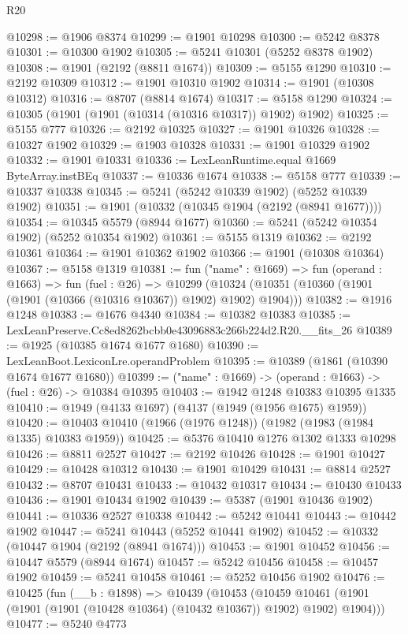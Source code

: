 \begin{lexlean}{R20}
\begin{coremodule}
@10298 := @1906 @8374
@10299 := @1901 @10298
@10300 := @5242 @8378
@10301 := @10300 @1902
@10305 := @5241 @10301 (@5252 @8378 @1902)
@10308 := @1901 (@2192 (@8811 @1674))
@10309 := @5155 @1290
@10310 := @2192 @10309
@10312 := @1901 @10310 @1902
@10314 := @1901 (@10308 @10312)
@10316 := @8707 (@8814 @1674)
@10317 := @5158 @1290
@10324 := @10305 (@1901 (@1901 (@10314 (@10316 @10317)) @1902) @1902)
@10325 := @5155 @777
@10326 := @2192 @10325
@10327 := @1901 @10326
@10328 := @10327 @1902
@10329 := @1903 @10328
@10331 := @1901 @10329 @1902
@10332 := @1901 @10331
@10336 := LexLeanRuntime.equal @1669 ByteArray.instBEq
@10337 := @10336 @1674
@10338 := @5158 @777
@10339 := @10337 @10338
@10345 := @5241 (@5242 @10339 @1902) (@5252 @10339 @1902)
@10351 := @1901 (@10332 (@10345 @1904 (@2192 (@8941 @1677))))
@10354 := @10345 @5579 (@8944 @1677)
@10360 := @5241 (@5242 @10354 @1902) (@5252 @10354 @1902)
@10361 := @5155 @1319
@10362 := @2192 @10361
@10364 := @1901 @10362 @1902
@10366 := @1901 (@10308 @10364)
@10367 := @5158 @1319
@10381 := fun ("name" : @1669) =>
  fun (operand : @1663) =>
  fun (fuel : @26) =>
  @10299 (@10324 (@10351 (@10360 (@1901 (@1901 (@10366 (@10316 @10367)) @1902) @1902) @1904)))
@10382 := @1916 @1248
@10383 := @1676 @4340
@10384 := @10382 @10383
@10385 := LexLeanPreserve.Cc8ed8262bcbb0e43096883c266b224d2.R20.__fits_26
@10389 := @1925 (@10385 @1674 @1677 @1680)
@10390 := LexLeanBoot.LexiconLre.operandProblem
@10395 := @10389 (@1861 (@10390 @1674 @1677 @1680))
@10399 := ("name" : @1669) -> (operand : @1663) -> (fuel : @26) -> @10384 @10395
@10403 := @1942 @1248 @10383 @10395 @1335
@10410 := @1949 (@4133 @1697) (@4137 (@1949 (@1956 @1675) @1959))
@10420 := @10403 @10410 (@1966 (@1976 @1248)) (@1982 (@1983 (@1984 @1335) @10383 @1959))
@10425 := @5376 @10410 @1276 @1302 @1333 @10298
@10426 := @8811 @2527
@10427 := @2192 @10426
@10428 := @1901 @10427
@10429 := @10428 @10312
@10430 := @1901 @10429
@10431 := @8814 @2527
@10432 := @8707 @10431
@10433 := @10432 @10317
@10434 := @10430 @10433
@10436 := @1901 @10434 @1902
@10439 := @5387 (@1901 @10436 @1902)
@10441 := @10336 @2527 @10338
@10442 := @5242 @10441
@10443 := @10442 @1902
@10447 := @5241 @10443 (@5252 @10441 @1902)
@10452 := @10332 (@10447 @1904 (@2192 (@8941 @1674)))
@10453 := @1901 @10452
@10456 := @10447 @5579 (@8944 @1674)
@10457 := @5242 @10456
@10458 := @10457 @1902
@10459 := @5241 @10458
@10461 := @5252 @10456 @1902
@10476 := @10425
    (fun (__b : @1898) =>
    @10439
      (@10453
        (@10459 @10461 (@1901 (@1901 (@1901 (@10428 @10364) (@10432 @10367)) @1902) @1902) @1904)))
@10477 := @5240 @4773

\end{coremodule}
\end{lexlean}
